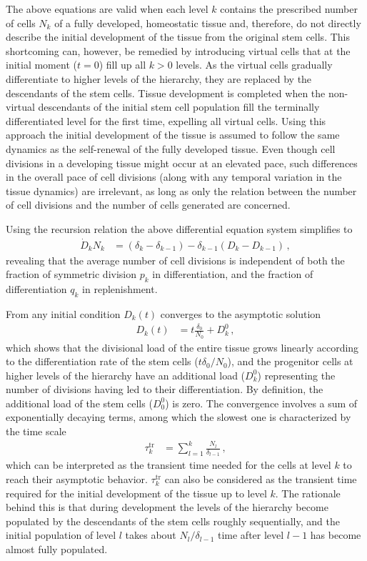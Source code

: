 \documentclass[aps,singlecolumn]{revtex4-1}
\begin{document}
The above equations are valid when each level $k$ contains the prescribed
number of cells $N_k$ of a fully developed, homeostatic tissue and, therefore,
do not directly describe the initial development of the tissue from the
original stem cells. This shortcoming can, however, be remedied by
introducing virtual cells that at the initial moment ($t=0$) fill up
all $k>0$ levels. As the virtual cells gradually differentiate to
higher levels of the hierarchy, they are replaced by the
descendants of the stem cells. Tissue development is completed when the
non-virtual descendants of the initial stem cell population fill the
terminally differentiated level for the first time,
expelling all virtual cells. Using this approach the initial
development of the tissue is assumed to follow the same dynamics as
the self-renewal of the fully developed tissue.
Even though cell
divisions in a developing tissue might occur at an elevated pace, such
differences in the overall pace of cell divisions
(along with any temporal variation in the tissue dynamics) are irrelevant,
as long as only the relation between the number of cell divisions and
the number of cells generated are concerned.

Using the recursion relation the above differential equation system
simplifies to
%
\begin{align}
 \dot D_k N_k &= (\delta_k -\delta_{k-1}) - \delta_{k-1} (D_k - D_{k-1})
\, ,
\end{align}
%
revealing that the average number of cell divisions is independent of both the
fraction of symmetric division $p_k$ in differentiation, and the
fraction of differentiation $q_k$ in replenishment.

From any initial condition $D_k(t)$ converges to the asymptotic solution
%
\begin{align}
 D_k(t) &= t \frac{\delta_0}{N_0} + D_k^0
\, ,
\label{Dkt}
\end{align}
%
which shows that the divisional load of the entire tissue grows
linearly according to the differentiation rate of the stem cells
($t\delta_0/N_0$), and the progenitor cells at higher
levels of the hierarchy have an additional load ($D_k^0$) representing
the number of divisions having led to their differentiation. By definition,
the additional load of the stem cells ($D_0^0$) is zero. The convergence
involves a sum of exponentially decaying terms, among which the slowest
one is characterized by the time scale
%
\begin{align}
 \tau_k^\textrm{tr} &= \sum_{l=1}^k \frac{N_l}{\delta_{l-1}}
\, ,
\label{tau}
\end{align}
%
which can be interpreted as the transient time needed for the cells at
level $k$ to reach their asymptotic behavior. $\tau_k^\textrm{tr}$ can
also be considered as the transient time required for the initial
development of the tissue up to level $k$. The rationale behind this is
that during development the levels of the hierarchy become populated by the
descendants of the stem cells roughly sequentially, and the initial
population of level $l$ takes about $N_l/\delta_{l-1}$ time after level $l-1$
has become almost fully populated.
\end{document}
